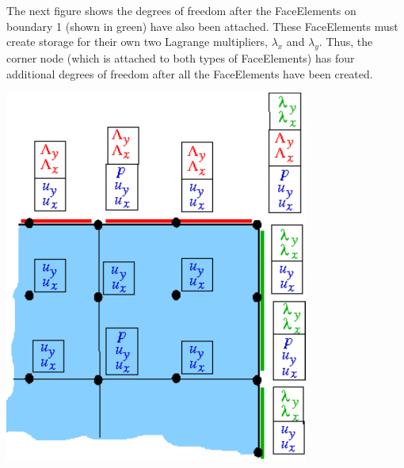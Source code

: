 The next figure shows the degrees of freedom after the {\ttfamily Face\+Elements} on boundary 1 (shown in green) have also been attached. These {\ttfamily Face\+Elements} must create storage for their own two Lagrange multipliers, $ \lambda_x $ and $ \lambda_y $. Thus, the corner node (which is attached to both types of {\ttfamily Face\+Elements}) has four additional degrees of freedom after all the {\ttfamily Face\+Elements} have been created.

 
\begin{DoxyImage}
\includegraphics[width=0.75\textwidth]{multiple_face_elements3}
\end{DoxyImage}


